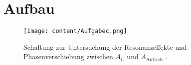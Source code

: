 \section{Aufbau}
\label{sec:Aufbau}

\begin{figure}[H]
         \centering
         \texttt{[image: content/Aufgabec.png]}
         \caption{Schaltung zur Untersuchung der Resonanzeffekte und Phasenverschiebung zwischen $A_C$ und $A_{\text{Antrieb}}$ \cite{V354}.}
         \label{fig:Schalplanc}
       \end{figure}
